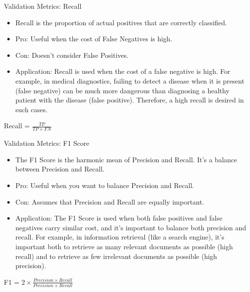 \documentclass[aspectratio=169]{../latex_main/tntbeamer}  %
\begin{document}
         \begin{frame}[c]{Validation Metrics: Recall}

        \begin{itemize}
            \item Recall is the proportion of actual positives that are correctly classified.
            \item \alert{Pro:} Useful when the cost of False Negatives is high.
            \item \alert{Con:} Doesn't consider False Positives.
            \item \alert{Application:} Recall is used when the cost of a false negative is high. For example, in medical diagnostics, failing to detect a disease when it is present (false negative) can be much more dangerous than diagnosing a healthy patient with the disease (false positive). Therefore, a high recall is desired in such cases.
        \end{itemize}

        \centering
        \bigskip

        Recall = $\frac{{TP}}{{TP + FN}}$

	\end{frame}

         \begin{frame}[c]{Validation Metrics: F1 Score}

        \begin{itemize}
            \item The F1 Score is the harmonic mean of Precision and Recall. It's a balance between Precision and Recall.
            \item \alert{Pro:} Useful when you want to balance Precision and Recall.
            \item \alert{Con:}  Assumes that Precision and Recall are equally important.
            \item \alert{Application:} The F1 Score is used when both false positives and false negatives carry similar cost, and it's important to balance both precision and recall. For example, in information retrieval (like a search engine), it's important both to retrieve as many relevant documents as possible (high recall) and to retrieve as few irrelevant documents as possible (high precision).
        \end{itemize}

        \centering
        \bigskip

        F1 = $2 \times \frac{{Precision \times Recall}}{{Precision + Recall}}$

	\end{frame}
\end{document}
